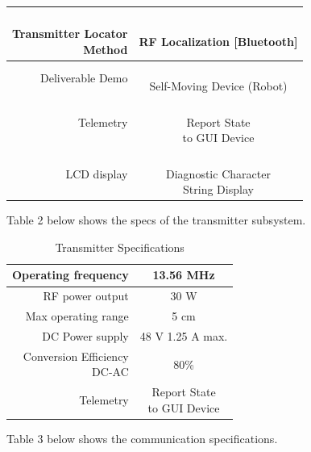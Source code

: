 \documentclass[12pt]{article}
\begin{document}
\begin{table}[h!]
\begin{tabular} {| r | c | }
\hline
\parbox{0.25\linewidth}{\raggedleft \hfill \\  Transmitter Locator \\ Method \\[0.4em]} &   \parbox{0.225\linewidth}{\centering \hfill \\  RF Localization  [Bluetooth]}\\
\hline
Deliverable Demo &   \parbox{0.25\linewidth}{\centering \hfill \\  Self-Moving Device (Robot)}\\
\hline
Telemetry &   \parbox{0.25\linewidth}{\centering \hfill \\  Report State \\to GUI Device}\\[0.4em]
\hline
LCD display &   \parbox{0.25\linewidth}{\centering \hfill \\  Diagnostic Character \\String Display}\\
\hline
\end{tabular}
\end{table}
 
 \pagebreak
 
\indent 
Table 2 below shows the specs of the transmitter subsystem.  

\hfill
 

\begin{table}[h!]
\centering
\caption{Transmitter Specifications}
\begin{tabular} {| r | c | }
\hline
Operating frequency & 13.56 MHz\\
\hline
RF power output & 30 W\\
\hline
Max operating range & 5 cm\\
\hline
DC Power supply  & 48 V 1.25 A max.  \\
\hline
\parbox{0.275\linewidth}{\raggedleft  Conversion Efficiency\\ DC-AC\\[0.4em]}  & 80\%\\
\hline
Telemetry &\parbox{0.24\linewidth}{\centering Report State \\to GUI Device\\[0.4em]}\\
\hline
\end{tabular}
\end{table}

\indent
Table 3 below shows the communication specifications. 
\hfill
\end{document}
